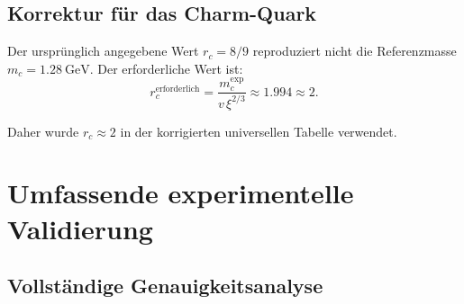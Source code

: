 \begin{table}[H]
	\centering
	\caption{Yukawa-Vorhersagen mit korrigierten $r_i,p_i$ und Vergleich mit Referenzmassen.}
	\label{tab:quark_yukawa_predictions}
\end{table}

\subsection{Korrektur für das Charm-Quark}
\label{subsec:charm_correction}

Der ursprünglich angegebene Wert $r_c=8/9$ reproduziert nicht die Referenzmasse $m_c=1.28\ \mathrm{GeV}$. Der erforderliche Wert ist:
\[
r_c^{\text{erforderlich}}=\frac{m_c^{\text{exp}}}{v\,\xi^{2/3}}\approx 1.994 \approx 2.
\]

Daher wurde $r_c \approx 2$ in der korrigierten universellen Tabelle verwendet.

\section{Umfassende experimentelle Validierung}
\label{sec:comprehensive_validation}

\subsection{Vollständige Genauigkeitsanalyse}
\label{subsec:complete_accuracy}

